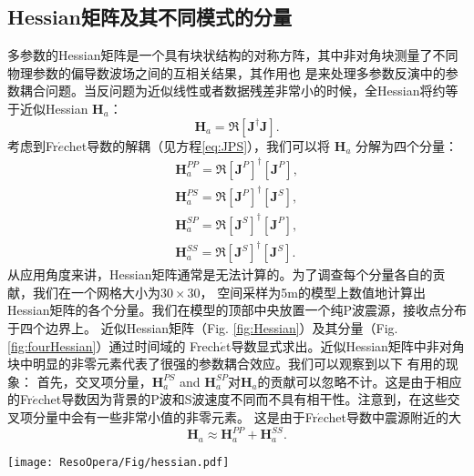 \subsection{Hessian矩阵及其不同模式的分量}
多参数的Hessian矩阵是一个具有块状结构的对称方阵，其中非对角块测量了不同物理参数的偏导数波场之间的互相关结果，其作用也
是来处理多参数反演中的参数耦合问题。当反问题为近似线性或者数据残差非常小的时候，全Hessian将约等于近似Hessian
$\mathbf{H}_a$\cite[]{pratt1998gauss}：
\begin{equation}
\mathbf{H}_a =\mathfrak{R}[{\mathbf{J}}^{\dagger}\mathbf{J}]. 
\label{eq:hess}
\end{equation}
考虑到Fr{$\acute{e}$}chet导数的解耦（见方程\ref{eq:JPS}），我们可以将 $\mathbf{H}_a$ 分解为四个分量：
\begin{equation}
\begin{split}
\mathbf{H}_a^{PP}=\mathfrak{R}[{\mathbf{J}^{P}}]^{\dagger}[{\mathbf{J}^{P}}],\\
\mathbf{H}_a^{PS}=\mathfrak{R}[{\mathbf{J}^{P}}]^{\dagger}[{\mathbf{J}^{S}}],\\
\mathbf{H}_a^{SP}=\mathfrak{R}[{\mathbf{J}^{S}}]^{\dagger}[{\mathbf{J}^{P}}],\\
\mathbf{H}_a^{SS}=\mathfrak{R}[{\mathbf{J}^{S}}]^{\dagger}[{\mathbf{J}^{S}}].
\end{split}
\label{eq:hessian_component}
\end{equation}
从应用角度来讲，Hessian矩阵通常是无法计算的。为了调查每个分量各自的贡献，我们在一个网格大小为$30\times30$，
空间采样为5m的模型上数值地计算出Hessian矩阵的各个分量。我们在模型的顶部中央放置一个纯P波震源，接收点分布于四个边界上。
近似Hessian矩阵（Fig. \ref{fig:Hessian}）及其分量（Fig. \ref{fig:fourHessian}）通过时间域的 Frech{$\acute{e}$}t导数显式求出。近似Hessian矩阵中非对角块中明显的非零元素代表了很强的参数耦合效应。我们可以观察到以下
有用的现象：
首先，交叉项分量，$\mathbf{H}_a^{PS}$ and $\mathbf{H}_a^{SP}$对$\mathbf{H}_a$的贡献可以忽略不计。这是由于相应
的Fr{$\acute{e}$}chet导数因为背景的P波和S波速度不同而不具有相干性。注意到，在这些交叉项分量中会有一些非常小值的非零元素。
这是由于Fr{$\acute{e}$}chet导数中震源附近的大
\begin{equation}
        \mathbf{H}_a\approx
        \mathbf{H}_a^{PP}+
        \mathbf{H}_a^{SS}.
        \label{eq:C3}
\end{equation}
\begin{figure*}
    \begin{center}
        \texttt{[image: ResoOpera/Fig/hessian.pdf]}
        \caption{
            The approximate Hessian $\mathbf{H}_a$.
    }
    \label{fig:Hessian} 
    \end{center}
\end{figure*}
